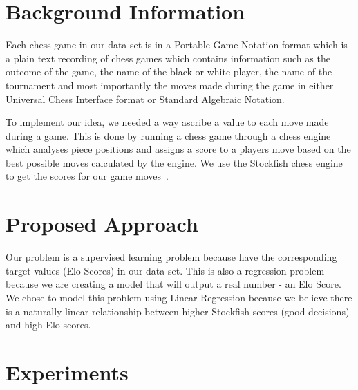 \documentclass{acm_proc_article-sp}
\begin{document}



\section{Background Information}

Each chess game in our data set is in a Portable Game Notation format which is a plain text recording of chess games which contains information such as the outcome of the game, the name of the black or white player, the name of the tournament and most importantly the moves made during the game in either Universal Chess Interface format or Standard Algebraic Notation.

To implement our idea, we needed a way ascribe a value to each move made during a game. This is done by running a chess game through a chess engine which analyses piece positions and assigns a score to a players move based on the best possible moves calculated by the engine. We use the Stockfish chess engine to get the scores for our game moves~\cite{Stockfish}. %

\section{Proposed Approach}

Our problem is a supervised learning problem because have the corresponding target values (Elo Scores) in our data set. This is also a regression problem because we are creating a model that will output a real number - an Elo Score. We chose to model this problem using Linear Regression because we believe there is a naturally linear relationship between higher Stockfish scores (good decisions) and high Elo scores. 



\section{Experiments}
\end{document}
